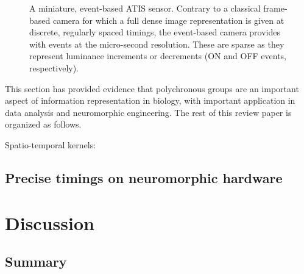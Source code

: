 \documentclass[brainsci, %
               review,submit,pdftex,moreauthors
               ]{Definitions/mdpi}
\begin{document}
\begin{figure}
\centering
\caption{A miniature, event-based ATIS sensor. Contrary to a classical frame-based camera for which a full dense image representation is given at discrete, regularly spaced timings, the event-based camera provides with events at the micro-second resolution. These are sparse as they represent luminance increments or decrements (ON and OFF events, respectively).}\label{fig:silicon_retina}
\end{figure}
This section has provided evidence that polychronous groups are an important aspect of information representation in biology, with important application in data analysis and neuromorphic engineering. The rest of this review paper is organized as follows.


Spatio-temporal kernels:~\citep{yu_stsc-snn_2022}


\subsection{Precise timings on neuromorphic hardware}


 
 
 
 



\section{Discussion}\label{sec:discussion}
\subsection{Summary}
 
\end{document}
